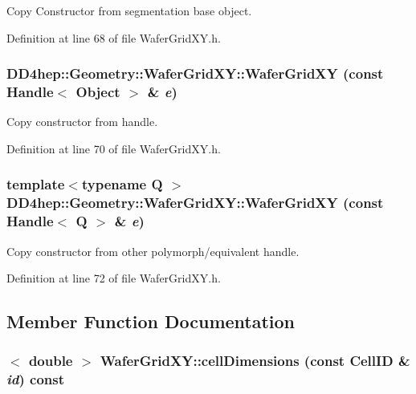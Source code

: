 Copy Constructor from segmentation base object. 

Definition at line 68 of file WaferGridXY.h.\hypertarget{class_d_d4hep_1_1_geometry_1_1_wafer_grid_x_y_a40cd601f880f3a345e62dd233d4f8345}{
\subsubsection[{WaferGridXY}]{\setlength{\rightskip}{0pt plus 5cm}DD4hep::Geometry::WaferGridXY::WaferGridXY (const {\bf Handle}$<$ {\bf Object} $>$ \& {\em e})}}
\label{class_d_d4hep_1_1_geometry_1_1_wafer_grid_x_y_a40cd601f880f3a345e62dd233d4f8345}


Copy constructor from handle. 

Definition at line 70 of file WaferGridXY.h.\hypertarget{class_d_d4hep_1_1_geometry_1_1_wafer_grid_x_y_aa2baf7a79ef17ba46038d243c700a588}{
\subsubsection[{WaferGridXY}]{\setlength{\rightskip}{0pt plus 5cm}template$<$typename Q $>$ DD4hep::Geometry::WaferGridXY::WaferGridXY (const {\bf Handle}$<$ Q $>$ \& {\em e})}}
\label{class_d_d4hep_1_1_geometry_1_1_wafer_grid_x_y_aa2baf7a79ef17ba46038d243c700a588}


Copy constructor from other polymorph/equivalent handle. 

Definition at line 72 of file WaferGridXY.h.

\subsection{Member Function Documentation}
\hypertarget{class_d_d4hep_1_1_geometry_1_1_wafer_grid_x_y_a6a03248b55e4fb3c5efd567b89c936cb}{
\subsubsection[{cellDimensions}]{$<$ double $>$ WaferGridXY::cellDimensions (const CellID \& {\em id}) const}}
\label{class_d_d4hep_1_1_geometry_1_1_wafer_grid_x_y_a6a03248b55e4fb3c5efd567b89c936cb}


